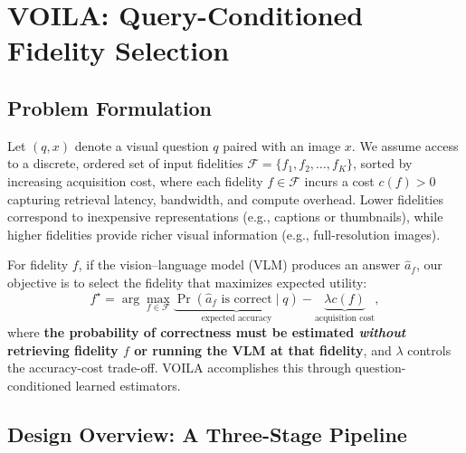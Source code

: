\section{VOILA: Query-Conditioned Fidelity Selection}\label{sec:method}

\subsection{Problem Formulation} Let $(q, x)$ denote a visual question $q$ paired with an image $x$.
We assume access to a discrete, ordered set of input fidelities $\mathcal{F} = \{f_1, f_2, \dots, f_K\}$,
sorted by increasing acquisition cost, where each fidelity $f \in \mathcal{F}$ incurs a cost $c(f) > 0$ capturing retrieval latency, bandwidth, and compute overhead.
Lower fidelities correspond to inexpensive representations (e.g., captions or thumbnails), while higher fidelities provide richer visual information (e.g., full-resolution images).


For fidelity $f$, if the vision--language model (VLM) produces an answer $\hat{a}_f$, our objective is to select the fidelity that maximizes expected utility:
\[
f^\star
=
\arg\max_{f \in \mathcal{F}}
\underbrace{\Pr(\hat{a}_f \text{ is correct} \mid q)}_{\text{expected accuracy}} - \underbrace{\lambda c(f)}_{\text{acquisition cost}},
\]
where \textbf{the probability of correctness must be estimated \emph{without} retrieving fidelity $f$ or running the VLM at that fidelity}, and $\lambda$ controls the accuracy-cost trade-off. VOILA accomplishes this through question-conditioned learned estimators.




\subsection{Design Overview: A Three-Stage Pipeline}

